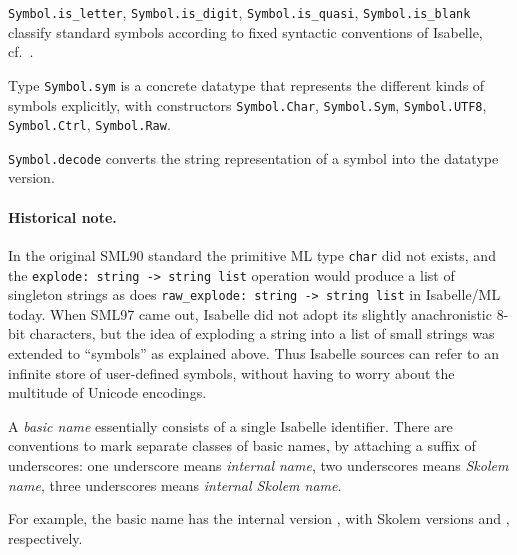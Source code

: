 \begin{isabellebody}
\begin{isamarkuptext}
\begin{description}
  \item \verb|Symbol.is_letter|, \verb|Symbol.is_digit|, \verb|Symbol.is_quasi|, \verb|Symbol.is_blank| classify standard
  symbols according to fixed syntactic conventions of Isabelle, cf.\
  \cite{isabelle-isar-ref}.

  \item Type \verb|Symbol.sym| is a concrete datatype that
  represents the different kinds of symbols explicitly, with
  constructors \verb|Symbol.Char|, \verb|Symbol.Sym|, \verb|Symbol.UTF8|, \verb|Symbol.Ctrl|, \verb|Symbol.Raw|.

  \item \verb|Symbol.decode| converts the string representation of a
  symbol into the datatype version.

  \end{description}

  \paragraph{Historical note.} In the original SML90 standard the
  primitive ML type \verb|char| did not exists, and the \verb|explode: string -> string list| operation would produce a list of
  singleton strings as does \verb|raw_explode: string -> string list|
  in Isabelle/ML today.  When SML97 came out, Isabelle did not adopt
  its slightly anachronistic 8-bit characters, but the idea of
  exploding a string into a list of small strings was extended to
  ``symbols'' as explained above.  Thus Isabelle sources can refer to
  an infinite store of user-defined symbols, without having to worry
  about the multitude of Unicode encodings.%
\end{isamarkuptext}%
\isamarkuptrue%
%
\endisatagmlref
{\isafoldmlref}%
%
\isadelimmlref
%
\endisadelimmlref
%
\isamarkuptrue%
%
\begin{isamarkuptext}%
A \emph{basic name} essentially consists of a single Isabelle
  identifier.  There are conventions to mark separate classes of basic
  names, by attaching a suffix of underscores: one underscore means
  \emph{internal name}, two underscores means \emph{Skolem name},
  three underscores means \emph{internal Skolem name}.

  For example, the basic name  has the internal version
  \isa{foo{\isaliteral{5F}{\isacharunderscore}}}, with Skolem versions  and , respectively.


\end{isamarkuptext}
\end{isabellebody}
